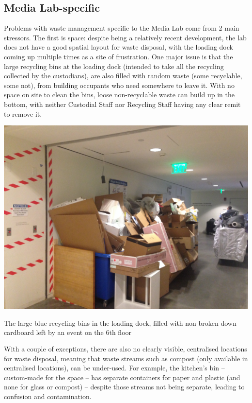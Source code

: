 \documentclass[nofonts,nols,justified,nobib]{tufte-book}
\begin{document}
\subsection*{Media Lab-specific}

Problems with waste management specific to the Media Lab come from 2 main stressors. The first is space: despite being a relatively recent development, the lab does not have a good spatial layout for waste disposal, with the loading dock coming up multiple times as a site of frustration. One major issue is that the large recycling bins at the loading dock (intended to take all the recycling collected by the custodians), are also filled with random waste (some recyclable, some not), from building occupants who need somewhere to leave it. With no space on site to clean the bins, loose non-recyclable waste can build up in the bottom, with neither Custodial Staff nor Recycling Staff having any clear remit to remove it.

\begin{marginfigure}
  \includegraphics[width=1\linewidth]{img/2/mit-bins/loading7.jpg}
  \caption{The large blue recycling bins in the loading dock, filled with non-broken down cardboard left by an event on the 6th floor}
\end{marginfigure}

With a couple of exceptions, there are also no clearly visible, centralised locations for waste disposal, meaning that waste streams such as compost (only available in centralised locations), can be under-used. For example, the kitchen's bin -- custom-made for the space -- has separate containers for paper and plastic (and none for glass or compost) -- despite those streams not being separate, leading to confusion and contamination.
\end{document}
